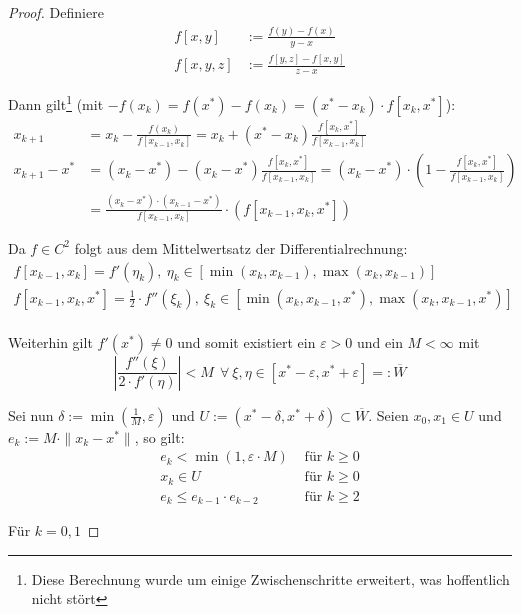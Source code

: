\begin{proof}
Definiere
\begin{align*}
f[x,y]   &:= \frac{f(y)-f(x)}{y-x} \\
f[x,y,z] &:= \frac{f[y,z]-f[x,y]}{z-x}
\end{align*}

Dann gilt\footnote{Diese Berechnung wurde um einige Zwischenschritte erweitert,
was hoffentlich nicht stört} (mit $-f(x_k) = f(x^*)-f(x_k) = (x^*-x_k)\cdot f[x_k,x^*]$):
\begin{align*}
  x_{k+1}&=x_k-\frac{f(x_k)}{f[x_{k-1},x_k]} = x_k + (x^*-x_k)\frac{f[x_k,x^*]}{f[x_{k-1},x_k]}
\\x_{k+1}-x^*& = (x_k - x^*) - (x_k-x^*)\frac{f[x_k,x^*]}{f[x_{k-1},x_k]} =
(x_k-x^*)\cdot (1-\frac{f[x_k,x^*]}{f[x_{k-1},x_k]})
\\&=\frac{(x_k-x^*)\cdot(x_{k-1}-x^*)}{f[x_{k-1},x_k]}\cdot (f[x_{k-1},x_k,x^*])
\end{align*}

Da $f\in C^2$ folgt aus dem Mittelwertsatz der Differentialrechnung:
\begin{align*}
f[x_{k-1},x_k]     =f'(\eta_k), \ \eta_k\in [\min(x_k,x_{k-1}), \max(x_k,x_{k-1})] \\
f[x_{k-1},x_k,x^*] =\frac{1}{2}\cdot f''(\xi_k), \ \xi_k\in [\min(x_k,x_{k-1},x^*), \max(x_k,x_{k-1},x^*)]\\
\end{align*}

Weiterhin gilt $f'(x^*)\neq 0$ und somit existiert ein $\varepsilon > 0$ und ein $M<\infty$ mit
\[ %
  \left| \frac{f''(\xi)}{2\cdot f'(\eta)} \right|<M \ \ \forall \ \xi,\eta\in
[x^*-\varepsilon,x^*+\varepsilon]=:\overline{W}
\]

Sei nun $\delta:= \min (\frac{1}{M},\varepsilon)$ und
$U:=(x^*-\delta,x^*+\delta)\subset \overline{W}$.
Seien $x_0, x_1\in U$ und $e_k:=M\cdot \|x_k-x^*\|$, so gilt:
\begin{align}
e_k< \min(1,\varepsilon \cdot M)  & \mbox{ für } k\geq 0 \label{eq:prop1}\\ %
x_k\in U                          & \mbox{ für } k\geq 0 \label{eq:prop2}\\ %
e_k\leq e_{k-1}\cdot e_{k-2}      & \mbox{ für } k\geq 2 \label{eq:prop3}   %
\end{align}

Für $k=0,1$ \checkmark\newline


\end{proof}
